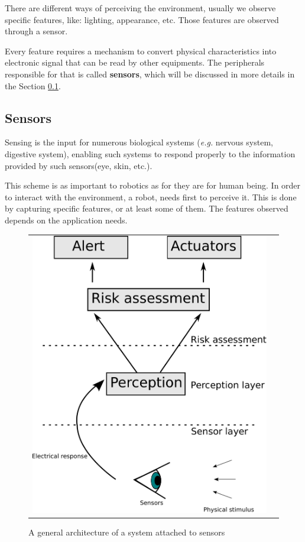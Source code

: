 There are different ways of perceiving the environment, usually we observe specific features, like: lighting, appearance, etc. Those features are observed through a sensor.

Every feature requires a mechanism to convert physical characteristics into electronic signal that can be read by other equipments. The peripherals responsible for that is called \textbf{sensors}, which will be discussed in more details in the Section \ref{sec:sensors}.


\subsection{Sensors}
\label{sec:sensors}


Sensing is the input for numerous biological systems (\textit{e.g.} nervous system, digestive system), enabling such systems to respond properly to the information provided by such sensors(eye, skin, etc.). 

This scheme is as important to robotics as for they are for human being. In order to interact with the environment, a robot, needs first to perceive it. This is done by capturing specific features, or at least some of them. The features observed depends on the application needs.

\begin{figure}[h]
   \centering
     \begin{tabular}{lr}
       \includegraphics[scale=0.45]{img/fig:sensors:role}
     \end{tabular}
   \caption{A general architecture of a system attached to sensors}
   \label{fig:sensors:role}
 \end{figure}

